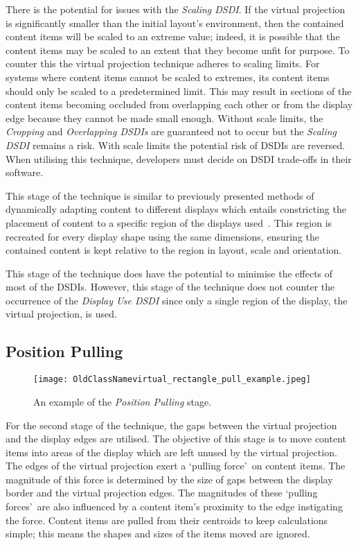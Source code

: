 \documentclass[review,5p,times,twocolumn]{elsarticle}
\begin{document}
There is the potential for issues with the {\emph{Scaling \ac{DSDI}}}.
If the virtual projection is significantly smaller than the initial
layout's environment, then the contained content items will be scaled to an extreme value; indeed, it is possible that the content items may be scaled to an extent that they become unfit for purpose.
To counter this the virtual projection technique adheres to scaling limits.
For systems where content items cannot be scaled to extremes, its content items should only be scaled to a predetermined limit.
This may result in sections of the content items becoming occluded from overlapping each other or from the display edge because they cannot be made small enough.
Without scale limits, the {\emph{Cropping}} and {\emph{Overlapping \acp{DSDI}}} are guaranteed not to occur but the {\emph{Scaling \ac{DSDI}}} remains a risk.
With scale limits the potential risk of \acp{DSDI} are reversed.
When utilising this technique, developers must decide on \ac{DSDI} trade-offs in their software.

This stage of the technique is similar to previously presented methods of dynamically adapting content to different displays which entails constricting the placement of content to a specific region of the displays used~\cite{Cotting2006,Raskar2003}.
This region is recreated for every display shape using the same dimensions, ensuring the contained content is kept relative to the region in layout, scale and orientation.

This stage of the technique does have the potential to minimise the effects of most of the \acp{DSDI}.
However, this stage of the technique does not counter the occurrence of the {\emph{Display Use \ac{DSDI}}} since only a single region of the display, the virtual projection, is used.

\subsection{Position Pulling}
\label{subsec:positionpulling} 

\begin{figure}[h] 
 \centering
   \texttt{[image: OldClassNamevirtual\_rectangle\_pull\_example.jpeg]}
   \caption{An example of the {\emph{Position Pulling}} stage.}
   \label{fig:pullLayout}
\end{figure}

For the second stage of the technique, the gaps between the virtual projection and the display edges are utilised.
The objective of this stage is to move content items into areas of the display which are left unused by the virtual projection.
The edges of the virtual projection exert a \lq pulling force\rq\ on content items.
The magnitude of this force is determined by the size of gaps between the display border and the virtual projection edges.
The magnitudes of these \lq pulling forces\rq\ are also influenced by a content item's proximity to the edge instigating the force.
Content items are pulled from their centroids to keep calculations simple; this means the shapes and sizes of the items moved are ignored.
\end{document}
